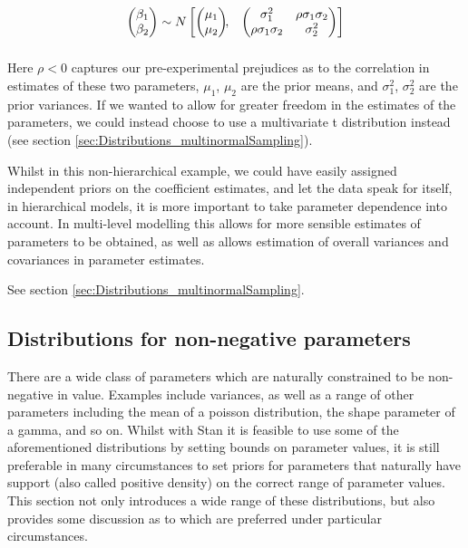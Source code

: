 \documentclass[11pt,fullpage]{book}
\begin{document}
\begin{align*}
\begin{pmatrix}\beta_{1}\\
\beta_{2}
\end{pmatrix} &\sim  N
\begin{bmatrix}
\begin{pmatrix}
\mu_1\\
\mu_2
\end{pmatrix}\!\!,&
\begin{pmatrix}
\sigma_1^2 & \rho\sigma_1\sigma_2\\
\rho\sigma_1\sigma_2 & \sigma_2^2
\end{pmatrix}
\end{bmatrix}\\[2\jot]
\end{align*}


Here $\rho<0$ captures our pre-experimental prejudices as to the correlation in estimates of these two parameters, $\mu_1$, $\mu_2$ are the prior means, and $\sigma_1^2$, $\sigma_2^2$ are the prior variances. If we wanted to allow for greater freedom in the estimates of the parameters, we could instead choose to use a multivariate t distribution instead (see section \ref{sec:Distributions_multinormalSampling}).

Whilst in this non-hierarchical example, we could have easily assigned independent priors on the coefficient estimates, and let the data speak for itself, in hierarchical models, it is more important to take parameter dependence into account. In multi-level modelling this allows for more sensible estimates of parameters to be obtained, as well as allows estimation of overall variances and covariances in parameter estimates.

See section \ref{sec:Distributions_multinormalSampling}.

\subsection{Distributions for non-negative parameters}
There are a wide class of parameters which are naturally constrained to be non-negative in value. Examples include variances, as well as a range of other parameters including the mean of a poisson distribution, the shape parameter of a gamma, and so on. Whilst with Stan it is feasible to use some of the aforementioned distributions by setting bounds on parameter values, it is still preferable in many circumstances to set priors for parameters that naturally have support (also called positive density) on the correct range of parameter values. This section not only introduces a wide range of these distributions, but also provides some discussion as to which are preferred under particular circumstances.
\end{document}
